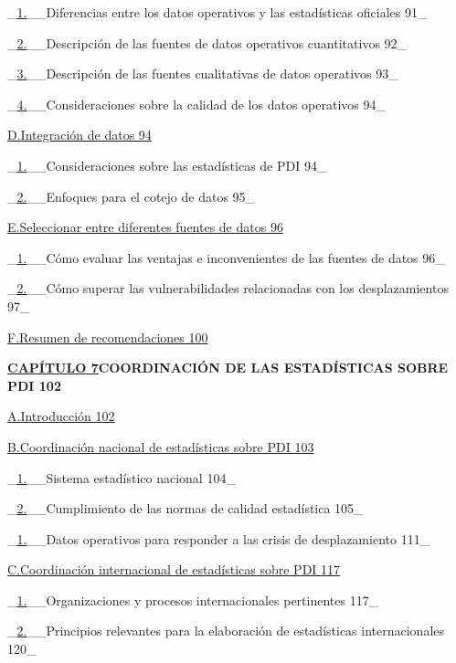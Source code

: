 \documentclass[
]{book}
\begin{document}
\_\protect\hyperlink{_Toc71834801}{1.}\_\_Diferencias entre los datos operativos y las estadísticas oficiales 91\_

\_\protect\hyperlink{_Toc71834802}{2.}\_\_Descripción de las fuentes de datos operativos cuantitativos 92\_

\_\protect\hyperlink{_Toc71834803}{3.}\_\_Descripción de las fuentes cualitativas de datos operativos 93\_

\_\protect\hyperlink{_Toc71834804}{4.}\_\_Consideraciones sobre la calidad de los datos operativos 94\_

\protect\hyperlink{_Toc71834805}{D.Integración de datos 94}

\_\protect\hyperlink{_Toc71834806}{1.}\_\_Consideraciones sobre las estadísticas de PDI 94\_

\_\protect\hyperlink{_Toc71834807}{2.}\_\_Enfoques para el cotejo de datos 95\_

\protect\hyperlink{_Toc71834808}{E.Seleccionar entre diferentes fuentes de datos 96}

\_\protect\hyperlink{_Toc71834809}{1.}\_\_Cómo evaluar las ventajas e inconvenientes de las fuentes de datos 96\_

\_\protect\hyperlink{_Toc71834810}{2.}\_\_Cómo superar las vulnerabilidades relacionadas con los desplazamientos 97\_

\protect\hyperlink{_Toc71834811}{F.Resumen de recomendaciones 100}

\textbf{\protect\hyperlink{_Toc71834812}{CAPÍTULO 7}COORDINACIÓN DE LAS ESTADÍSTICAS SOBRE PDI 102}

\protect\hyperlink{_Toc71834813}{A.Introducción 102}

\protect\hyperlink{_Toc71834814}{B.Coordinación nacional de estadísticas sobre PDI 103}

\_\protect\hyperlink{_Toc71834815}{1.}\_\_Sistema estadístico nacional 104\_

\_\protect\hyperlink{_Toc71834816}{2.}\_\_Cumplimiento de las normas de calidad estadística 105\_

\_\protect\hyperlink{_Toc71834817}{1.}\_\_Datos operativos para responder a las crisis de desplazamiento 111\_

\protect\hyperlink{_Toc71834818}{C.Coordinación internacional de estadísticas sobre PDI 117}

\_\protect\hyperlink{_Toc71834819}{1.}\_\_Organizaciones y procesos internacionales pertinentes 117\_

\_\protect\hyperlink{_Toc71834820}{2.}\_\_Principios relevantes para la elaboración de estadísticas internacionales 120\_
\end{document}
